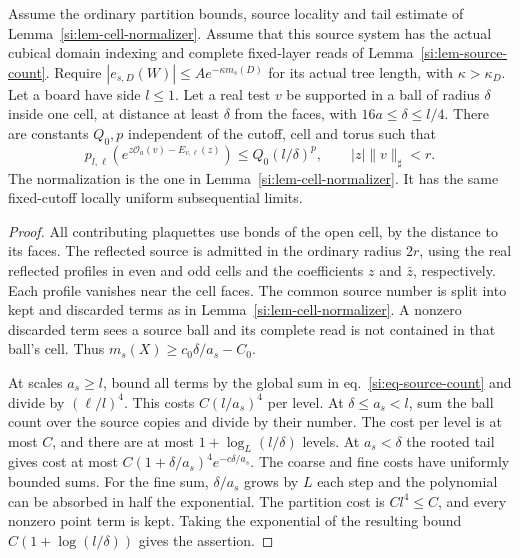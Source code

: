 \documentclass[11pt,letterpaper,reqno]{amsart}
\makeatletter
\numberwithin{equation}{section}
\renewcommand{\eqref}[1]{\textup{eq.~\ref{#1}}}
\theoremstyle{definition}
\newcommand{\ms@minorstart}{%
  \pushQED{\qed}\renewcommand{\qedsymbol}{$\blacksquare$}}
\newenvironment{lemma}[1][]{\ms@minorstart\ms@lemma[#1]}
  {\popQED\endms@lemma}
\theoremstyle{remark}
\makeatother
\begin{document}
\begin{samepage}
\begin{lemma}[One-cell cost across scales]\label{si:lem-scale-cell-price}
Assume the ordinary partition bounds, source locality and tail
estimate of Lemma~\ref{si:lem-cell-normalizer}. Assume that this
source system has the actual cubical domain indexing and complete
fixed-layer reads of Lemma~\ref{si:lem-source-count}. Require
$|e_{s,D}(W)|\le A e^{-\kappa m_s(D)}$ for its actual tree length,
with $\kappa>\kappa_D$. Let a board have side
$l\le1$. Let a real test $v$ be supported in a ball of radius
$\delta$ inside one cell, at distance at least $\delta$ from the
faces, with $16a\le\delta\le l/4$. There are constants $Q_0,p$
independent of the cutoff, cell and torus such that
\begin{equation}\label{si:eq-scale-cell-price}
 p_{l,\ell}\!\left(e^{z\mathcal O_a(v)-E_{v,\ell}(z)}\right)
       \le Q_0(l/\delta)^p,\qquad |z|\|v\|_\sharp<r.
\end{equation}
The normalization is the one in Lemma~\ref{si:lem-cell-normalizer}.
It has the same fixed-cutoff locally uniform subsequential limits.
\end{lemma}
\end{samepage}
\begin{proof}
All contributing plaquettes use bonds of the open cell, by the
distance to its faces. The reflected source is admitted in the
ordinary radius $2r$, using the real reflected profiles in even
and odd cells and the coefficients $z$ and $\bar z$, respectively.
Each profile vanishes near the cell faces. The common source number
is split into kept and discarded terms as in
Lemma~\ref{si:lem-cell-normalizer}. A nonzero discarded term sees a
source ball and its complete read is not contained in that ball's
cell. Thus $m_s(X)\ge c_0\delta/a_s-C_0$.

At scales $a_s\ge l$, bound all terms by the global sum in
\eqref{si:eq-source-count} and divide by $(\ell/l)^4$. This costs
$C(l/a_s)^4$ per level. At $\delta\le a_s<l$, sum the ball count
over the source copies and divide by their number. The cost per
level is at most $C$, and there are at most $1+\log_L(l/\delta)$
levels. At $a_s<\delta$ the rooted tail gives cost at most
$C(1+\delta/a_s)^4e^{-c\delta/a_s}$. The coarse and fine costs have
uniformly bounded sums. For the fine sum, $\delta/a_s$ grows by
$L$ each step and the polynomial can be absorbed in half the
exponential. The partition cost is $Cl^4\le C$, and every
nonzero point term is kept. Taking the exponential of the
resulting bound $C(1+\log(l/\delta))$ gives the assertion.
\end{proof}
\end{document}
